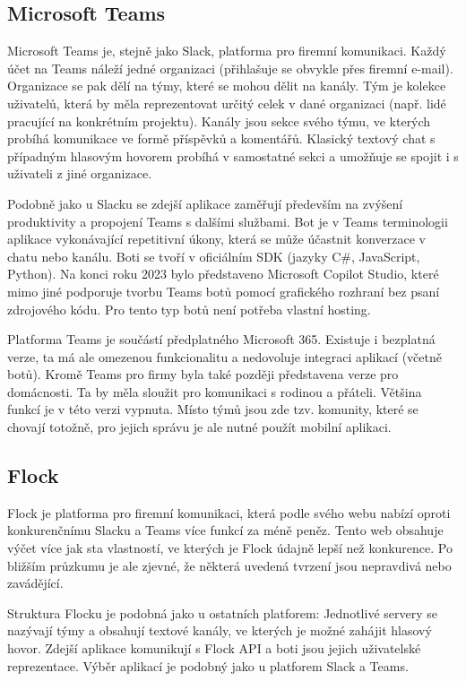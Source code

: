 \documentclass[FM]{tulthesis}
\begin{document}
	\subsection{Microsoft Teams}
	
	Microsoft Teams je, stejně jako Slack, platforma pro firemní komunikaci. Každý účet na Teams náleží jedné organizaci (přihlašuje se obvykle přes firemní e-mail). Organizace se pak dělí na týmy, které se mohou dělit na kanály. Tým je kolekce uživatelů, která by měla reprezentovat určitý celek v dané organizaci (např. lidé pracující na konkrétním projektu). Kanály jsou sekce svého týmu, ve kterých probíhá komunikace ve formě příspěvků a komentářů. Klasický textový chat s případným hlasovým hovorem probíhá v samostatné sekci a umožňuje se spojit i s uživateli z jiné organizace.
	
	Podobně jako u Slacku se zdejší aplikace zaměřují především na zvýšení produktivity a propojení Teams s dalšími službami. Bot je v Teams terminologii aplikace vykonávající repetitivní úkony, která se může účastnit konverzace v chatu nebo kanálu. Boti se tvoří v oficiálním SDK (jazyky C\#, JavaScript, Python). Na konci roku 2023 bylo představeno Microsoft Copilot Studio, které mimo jiné podporuje tvorbu Teams botů pomocí grafického rozhraní bez psaní zdrojového kódu. Pro tento typ botů není potřeba vlastní hosting.
	
	Platforma Teams je součástí předplatného Microsoft 365. Existuje i bezplatná verze, ta má ale omezenou funkcionalitu a nedovoluje integraci aplikací (včetně botů). Kromě Teams pro firmy byla také později představena verze pro domácnosti. Ta by měla sloužit pro komunikaci s rodinou a přáteli. Většina funkcí je v této verzi vypnuta. Místo týmů jsou zde tzv. komunity, které se chovají totožně, pro jejich správu je ale nutné použít mobilní aplikaci.
	
	\subsection{Flock}
	
	Flock je platforma pro firemní komunikaci, která podle svého webu nabízí oproti konkurenčnímu Slacku a Teams více funkcí za méně peněz. Tento web obsahuje výčet více jak sta vlastností, ve kterých je Flock údajně lepší než konkurence. Po bližším průzkumu je ale zjevné, že některá uvedená tvrzení jsou nepravdivá nebo zavádějící.
	
	Struktura Flocku je podobná jako u ostatních platforem: Jednotlivé servery se nazývají týmy a obsahují textové kanály, ve kterých je možné zahájit hlasový hovor. Zdejší aplikace komunikují s Flock API a boti jsou jejich uživatelské reprezentace. Výběr aplikací je podobný jako u platforem Slack a Teams.
	
\end{document}
